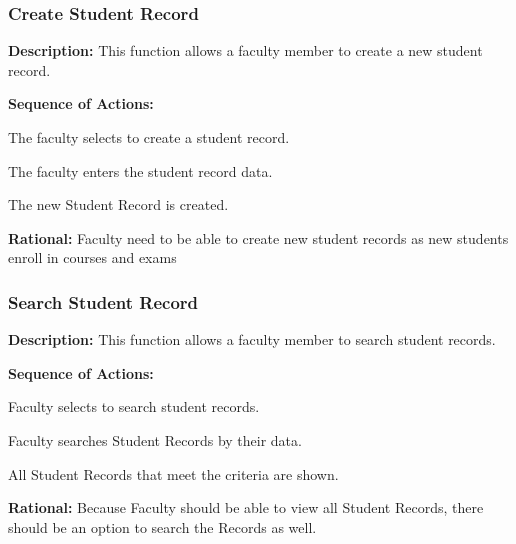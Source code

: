    \subsubsection{\large Create Student Record} 
   \begin{boxed} %
      \textbf{Description:}
      {\small This function allows a faculty member to create a new student
         record. }
         
         \textbf{Sequence of Actions:}
         \begin{enumerate}
               {\small
            \item The faculty selects to create a student record.
            \item The faculty enters the student record data.
            \item The new Student Record is created.}
      \end{enumerate}

         \textbf{Rational:}
         {\small Faculty need to be able to create new student records as new students
         enroll in courses and exams}
   \end{boxed} %

   \subsubsection{\large Search Student Record} 
   \begin{boxed} %
      \textbf{Description:}
      {\small This function allows a faculty member to search student records.}
         
         \textbf{Sequence of Actions:}
         \begin{enumerate}
               {\small
            \item Faculty selects to search student records.
            \item Faculty searches Student Records by their data.
            \item All Student Records that meet the criteria are shown.}
      \end{enumerate}

         \textbf{Rational:}
         {\small Because Faculty should be able to view all Student Records, there
         should be an option to search the Records as well.}
   \end{boxed} %

